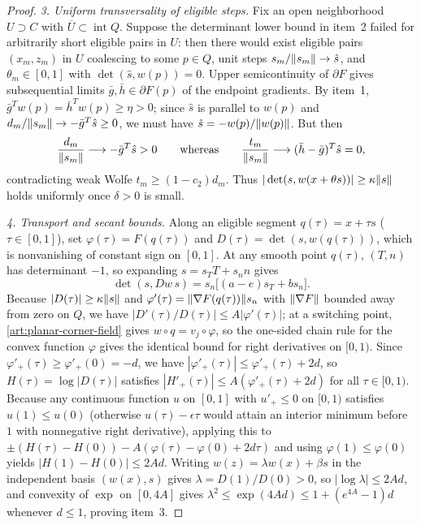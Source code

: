 \begin{proof}
\emph{3. Uniform transversality of eligible steps.}
Fix an open neighborhood $U\supset C$ with $\overline U\subset\operatorname{int}Q$.
Suppose the determinant lower bound in item~2 failed for arbitrarily short
eligible pairs in $U$: then there would exist eligible pairs $(x_m,z_m)$ in $U$
coalescing to some $p\in Q$, unit steps $s_m/\lVert s_m\rVert\to\hat s$, and
$\theta_m\in[0,1]$ with $\det(\hat s,w(p))=0$. Upper semicontinuity of
$\partial F$ gives subsequential limits $\bar g,\bar h\in\partial F(p)$ of the
endpoint gradients. By item~1, $\bar g^Tw(p)=\bar h^Tw(p)\ge\eta>0$; since
$\hat s$ is parallel to $w(p)$ and $d_m/\lVert s_m\rVert\to-\bar g^T\hat s\ge0$, we
must have $\hat s=-w(p)/\lVert w(p)\rVert$. But then
\[
 \frac{d_m}{\lVert s_m\rVert}\longrightarrow-\bar g^T\hat s>0
 \qquad\text{whereas}\qquad
 \frac{t_m}{\lVert s_m\rVert}\longrightarrow(\bar h-\bar g)^T\hat s=0,
\]
contradicting weak Wolfe $t_m\ge(1-c_2)d_m$. Thus $|\det(s,w(x+\theta s))|\ge\kappa\lVert s\rVert$
holds uniformly once $\delta>0$ is small.

\emph{4. Transport and secant bounds.}
Along an eligible segment $q(\tau)=x+\tau s$ ($\tau\in[0,1]$), set
$\varphi(\tau)=F(q(\tau))$ and $D(\tau)=\det(s,w(q(\tau)))$, which is nonvanishing
of constant sign on $[0,1]$. At any smooth point $q(\tau)$, $(T,n)$ has
determinant $-1$, so expanding $s=s_TT+s_nn$ gives
\begin{equation}\label{art:planar-determinant-derivative}
 \det(s,Dw\,s)=s_n\bigl[(a-e)s_T+bs_n\bigr].
\end{equation}
Because $|D(\tau)|\ge\kappa\lVert s\rVert$ and $\varphi'(\tau)=\lVert\nabla F(q(\tau))\rVert s_n$
with $\lVert\nabla F\rVert$ bounded away from zero on $Q$, we have
$|D'(\tau)/D(\tau)|\le A|\varphi'(\tau)|$; at a switching point,
\eqref{art:planar-corner-field} gives $w\circ q=v_j\circ\varphi$, so the
one-sided chain rule for the convex function $\varphi$ gives the identical bound
for right derivatives on $[0,1)$. Since $\varphi'_+(\tau)\ge\varphi'_+(0)=-d$,
we have $|\varphi'_+(\tau)|\le\varphi'_+(\tau)+2d$, so $H(\tau)=\log|D(\tau)|$
satisfies $|H'_+(\tau)|\le A(\varphi'_+(\tau)+2d)$ for all $\tau\in[0,1)$.
Because any continuous function $u$ on $[0,1]$ with $u'_+\le0$ on $[0,1)$
satisfies $u(1)\le u(0)$ (otherwise $u(\tau)-\epsilon\tau$ would attain an
interior minimum before $1$ with nonnegative right derivative), applying this to
$\pm(H(\tau)-H(0))-A(\varphi(\tau)-\varphi(0)+2d\tau)$ and using
$\varphi(1)\le\varphi(0)$ yields $|H(1)-H(0)|\le2Ad$. Writing
$w(z)=\lambda w(x)+\beta s$ in the independent basis $(w(x),s)$ gives
$\lambda=D(1)/D(0)>0$, so $|\log\lambda|\le2Ad$, and convexity of $\exp$ on
$[0,4A]$ gives $\lambda^2\le\exp(4Ad)\le1+(e^{4A}-1)d$ whenever $d\le1$,
proving item~3.


\end{proof}
